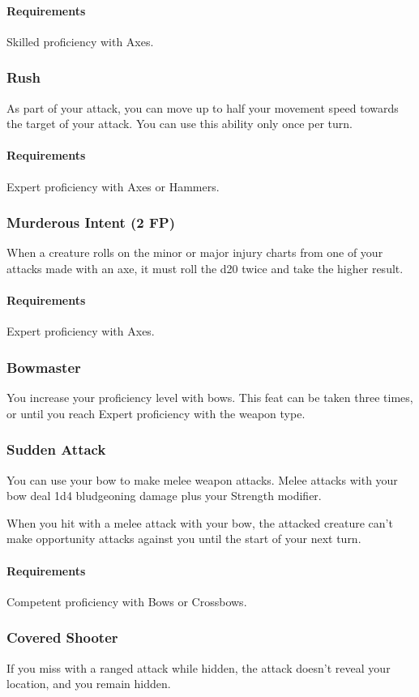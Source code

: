     \paragraph{Requirements} Skilled proficiency with Axes.
\subsubsection{Rush} \label{feat::rush}
    As part of your attack, you can move up to half your movement speed towards the target of your attack.
    You can use this ability only once per turn.
    \paragraph{Requirements} Expert proficiency with Axes or Hammers.
\subsubsection{Murderous Intent (2 FP)} \label{feat::murderousintent}
    When a creature rolls on the minor or major injury charts from one of your attacks made with an axe, it must roll the d20 twice and take the higher result.
    \paragraph{Requirements} Expert proficiency with Axes.
\subsubsection{Bowmaster} \label{feat::bowmaster}
    You increase your proficiency level with bows.
    This feat can be taken three times, or until you reach Expert proficiency with the weapon type.
\subsubsection{Sudden Attack} \label{feat::suddenattack}
    You can use your bow to make melee weapon attacks.
    Melee attacks with your bow deal 1d4 bludgeoning damage plus your Strength modifier.

    When you hit with a melee attack with your bow, the attacked creature can't make opportunity attacks against you until the start of your next turn.
    \paragraph{Requirements} Competent proficiency with Bows or Crossbows.
\subsubsection{Covered Shooter} \label{feat::coveredshooter}
    If you miss with a ranged attack while hidden, the attack doesn't reveal your location, and you remain hidden.
